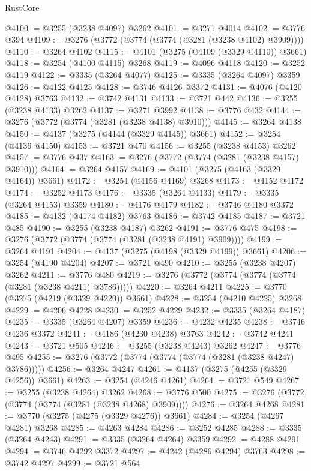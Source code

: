 \begin{lexlean}{RustCore}
\begin{coremodule}
@4100 := @3255 (@3238 @4097) @3262
@4101 := @3271 @4014
@4102 := @3776 @394
@4109 := @3276 (@3772 (@3774 (@3774 (@3281 (@3238 @4102) @3909))))
@4110 := @3264 @4102
@4115 := @4101 (@3275 (@4109 (@3329 @4110)) @3661)
@4118 := @3254 (@4100 @4115) @3268
@4119 := @4096 @4118
@4120 := @3252 @4119
@4122 := @3335 (@3264 @4077)
@4125 := @3335 (@3264 @4097) @3359
@4126 := @4122 @4125
@4128 := @3746 @4126 @3372
@4131 := @4076 (@4120 @4128) @3763
@4132 := @3742 @4131
@4133 := @3721 @442
@4136 := @3255 (@3238 @4133) @3262
@4137 := @3271 @3992
@4138 := @3776 @432
@4144 := @3276 (@3772 (@3774 (@3281 (@3238 @4138) @3910)))
@4145 := @3264 @4138
@4150 := @4137 (@3275 (@4144 (@3329 @4145)) @3661)
@4152 := @3254 (@4136 @4150)
@4153 := @3721 @470
@4156 := @3255 (@3238 @4153) @3262
@4157 := @3776 @437
@4163 := @3276 (@3772 (@3774 (@3281 (@3238 @4157) @3910)))
@4164 := @3264 @4157
@4169 := @4101 (@3275 (@4163 (@3329 @4164)) @3661)
@4172 := @3254 (@4156 @4169) @3268
@4173 := @4152 @4172
@4174 := @3252 @4173
@4176 := @3335 (@3264 @4133)
@4179 := @3335 (@3264 @4153) @3359
@4180 := @4176 @4179
@4182 := @3746 @4180 @3372
@4185 := @4132 (@4174 @4182) @3763
@4186 := @3742 @4185
@4187 := @3721 @485
@4190 := @3255 (@3238 @4187) @3262
@4191 := @3776 @475
@4198 := @3276 (@3772 (@3774 (@3774 (@3281 (@3238 @4191) @3909))))
@4199 := @3264 @4191
@4204 := @4137 (@3275 (@4198 (@3329 @4199)) @3661)
@4206 := @3254 (@4190 @4204)
@4207 := @3721 @490
@4210 := @3255 (@3238 @4207) @3262
@4211 := @3776 @480
@4219 := @3276 (@3772 (@3774 (@3774 (@3774 (@3281 (@3238 @4211) @3786)))))
@4220 := @3264 @4211
@4225 := @3770 (@3275 (@4219 (@3329 @4220)) @3661)
@4228 := @3254 (@4210 @4225) @3268
@4229 := @4206 @4228
@4230 := @3252 @4229
@4232 := @3335 (@3264 @4187)
@4235 := @3335 (@3264 @4207) @3359
@4236 := @4232 @4235
@4238 := @3746 @4236 @3372
@4241 := @4186 (@4230 @4238) @3763
@4242 := @3742 @4241
@4243 := @3721 @505
@4246 := @3255 (@3238 @4243) @3262
@4247 := @3776 @495
@4255 := @3276 (@3772 (@3774 (@3774 (@3774 (@3281 (@3238 @4247) @3786)))))
@4256 := @3264 @4247
@4261 := @4137 (@3275 (@4255 (@3329 @4256)) @3661)
@4263 := @3254 (@4246 @4261)
@4264 := @3721 @549
@4267 := @3255 (@3238 @4264) @3262
@4268 := @3776 @500
@4275 := @3276 (@3772 (@3774 (@3774 (@3281 (@3238 @4268) @3909))))
@4276 := @3264 @4268
@4281 := @3770 (@3275 (@4275 (@3329 @4276)) @3661)
@4284 := @3254 (@4267 @4281) @3268
@4285 := @4263 @4284
@4286 := @3252 @4285
@4288 := @3335 (@3264 @4243)
@4291 := @3335 (@3264 @4264) @3359
@4292 := @4288 @4291
@4294 := @3746 @4292 @3372
@4297 := @4242 (@4286 @4294) @3763
@4298 := @3742 @4297
@4299 := @3721 @564

\end{coremodule}
\end{lexlean}
